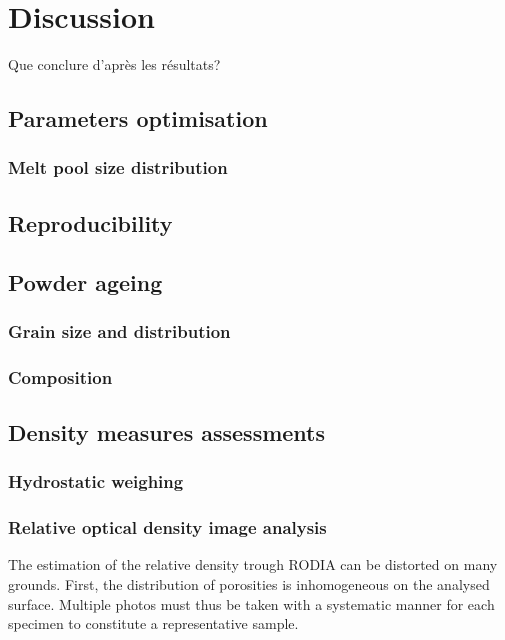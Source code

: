 \chapter{Discussion}
\label{Chap5}
Que conclure d'après les résultats?

\section{Parameters optimisation}


\subsection{Melt pool size distribution}

\section{Reproducibility}

\section{Powder ageing}
\subsection{Grain size and distribution}
\subsection{Composition}

\section{Density measures assessments}
\subsection{Hydrostatic weighing}

\subsection{Relative optical density image analysis}
The estimation of the relative density trough RODIA can be distorted on many grounds. First, the distribution of porosities is inhomogeneous on the analysed surface. Multiple photos must thus be taken with a systematic manner for each specimen to constitute a representative sample.\\

